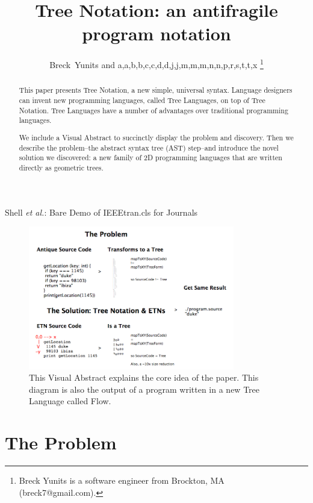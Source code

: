\documentclass[journal]{IEEEtran}
\begin{document}
\title{Tree Notation: an antifragile program notation}

\author{Breck~Yunits and a,a,b,b,c,c,d,d,j,j,m,m,m,n,n,p,r,s,t,t,x%
\thanks{Breck Yunits is a software engineer from Brockton, MA (breck7@gmail.com).}%
}

%
{Shell \MakeLowercase{\textit{et al.}}: Bare Demo of IEEEtran.cls for Journals}

\maketitle


\begin{abstract}
This paper presents Tree Notation, a new simple, universal syntax. Language designers can invent new programming languages, called Tree Languages, on top of Tree Notation. Tree Languages have a number of advantages over traditional programming languages.

We include a Visual Abstract to succinctly display the problem and discovery. Then we describe the problem--the abstract syntax tree (AST) step--and introduce the novel solution we discovered: a new family of 2D programming languages that are written directly as geometric trees.
\end{abstract}

\IEEEpeerreviewmaketitle

\begin{figure}[ht!]
\centering
\includegraphics[width=90mm]{treenotation.png}
\caption{This Visual Abstract explains the core idea of the paper. This diagram is also the output of a program written in a new Tree Language called Flow.}
\end{figure}

\section{The Problem}
\end{document}
